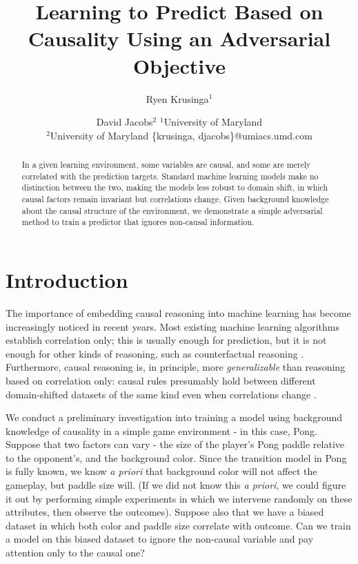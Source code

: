 \documentclass{article}
\title{Learning to Predict Based on Causality Using an Adversarial Objective}
\author{
Ryen Krusinga$^1$
\and
David Jacobs$^2$
\affiliations
$^1$University of Maryland\\
$^2$University of Maryland
\emails
\{krusinga, djacobs\}@umiacs.umd.com
}
\begin{document}
\maketitle

\begin{abstract}
In a given learning environment, some variables are causal, and some are merely correlated with the prediction targets. Standard machine learning models make no distinction between the two, making the models less robust to domain shift, in which causal factors remain invariant but correlations change. Given background knowledge about the causal structure of the environment, we demonstrate a simple adversarial method to train a predictor that ignores non-causal information. %
\end{abstract}



\section{Introduction}
The importance of embedding causal reasoning into machine learning has become increasingly noticed in recent years. Most existing machine learning algorithms establish correlation only; this is usually enough for prediction, but it is not enough for other kinds of reasoning, such as counterfactual reasoning \cite{pearl2018theoretical} \cite{Pearl2009}. Furthermore, causal reasoning is, in principle, 
more \emph{generalizable} than reasoning based on correlation only: causal rules presumably hold between different domain-shifted datasets of the same kind even when correlations change \cite{Bottou2019presentation}. 

We conduct a preliminary investigation into training a model using background knowledge of causality in a simple game environment - in this case, Pong. Suppose that two factors can vary - the size of the player's Pong paddle relative to the opponent's, and the background color. Since the transition model in Pong is fully known, we know \emph{a priori} that background color will not affect the gameplay, but paddle size will. (If we did not know this \emph{a priori}, we could figure it out by performing simple experiments in which we intervene randomly on these attributes, then observe the outcomes). Suppose also that we have a biased dataset in which both color and paddle size correlate with outcome. Can we train a model on this biased dataset to ignore the non-causal variable and pay attention only to the causal one?
\end{document}
